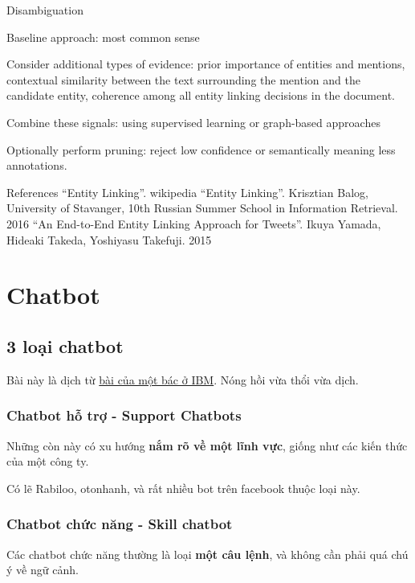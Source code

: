 Disambiguation


Baseline approach: most common sense

Consider additional types of evidence: prior importance of entities and mentions, contextual similarity between the text surrounding the mention and the candidate entity, coherence among all entity linking decisions in the document.

Combine these signals: using supervised learning or graph-based approaches

Optionally perform pruning: reject low confidence or semantically meaning less annotations.

References
“Entity Linking”. wikipedia
“Entity Linking”. Krisztian Balog, University of Stavanger, 10th Russian Summer School in Information Retrieval. 2016
“An End-to-End Entity Linking Approach for Tweets”. Ikuya Yamada, Hideaki Takeda, Yoshiyasu Takefuji. 2015

\section{Chatbot}


\subsection{3 loại chatbot}

Bài này là dịch từ \href{https://www.ibm.com/blogs/watson/2017/12/3-types-of-business-chatbots-you-can-build/}{bài của một bác ở IBM}. Nóng hồi vừa thổi vừa dịch.

\subsubsection{Chatbot hỗ trợ - Support Chatbots}

Những còn này có xu hướng \textbf{nắm rõ về một lĩnh vực}, giống như các kiến thức của một công ty.

Có lẽ Rabiloo, otonhanh, và rất nhiều bot trên facebook thuộc loại này.

\subsubsection{Chatbot chức năng - Skill chatbot}

Các chatbot chức năng thường là loại \textbf{một câu lệnh}, và không cần phải quá chú ý về ngữ cảnh.

